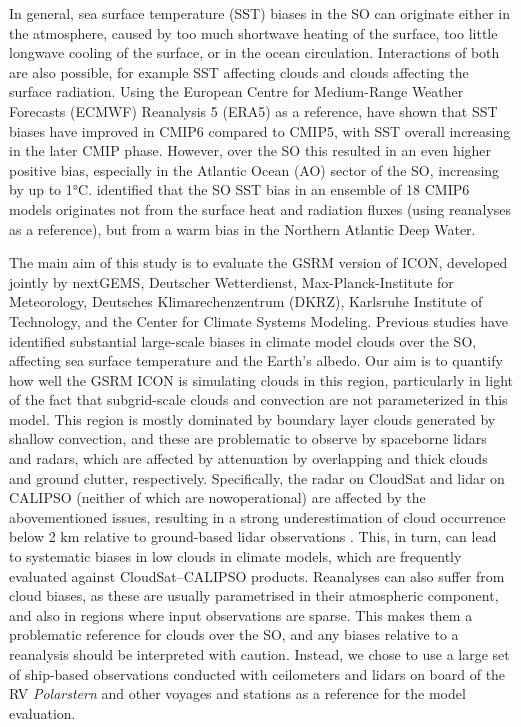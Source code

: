 \documentclass[12pt,a4paper]{article}
\begin{document}
In general, sea surface temperature (SST) biases in the SO can originate either
in the atmosphere, caused by too much shortwave heating of the surface, too
little longwave cooling of the surface, or in the ocean circulation.
Interactions of both are also possible, for example SST affecting clouds and
clouds affecting the surface radiation. Using the European
Centre for Medium-Range Weather Forecasts (ECMWF) Reanalysis 5 (ERA5) as a reference, \cite{zhang2023} have shown that SST
biases have improved in CMIP6 compared to CMIP5, with SST
overall increasing in the later CMIP phase. However, over the SO this resulted
in an even higher positive bias, especially in the Atlantic Ocean (AO) sector
of the SO, increasing by up to 1°C.  \cite{luo2023} identified that the SO SST
bias in an ensemble of 18 CMIP6 models originates not from the surface heat and
radiation fluxes (using reanalyses as a reference), but from a warm bias in the
Northern Atlantic Deep Water.

The main aim of this study is to evaluate the GSRM version of ICON, developed
jointly by nextGEMS, Deutscher Wetterdienst, Max-Planck-Institute for
Meteorology, Deutsches Klimarechenzentrum (DKRZ), Karlsruhe Institute of
Technology, and the Center for Climate Systems Modeling.  Previous studies have
identified substantial large-scale biases in climate model clouds over the SO,
affecting sea surface temperature and the Earth’s albedo. Our aim is to
quantify how well the GSRM ICON is simulating clouds in this region,
particularly in light of the fact that subgrid-scale clouds and convection are
not parameterized in this model. This region is mostly dominated by boundary
layer clouds generated by shallow convection, and these are problematic to
observe by spaceborne lidars and radars, which are affected by attenuation by
overlapping and thick clouds and ground clutter, respectively.  Specifically,
the radar on CloudSat and lidar on CALIPSO (neither of which are nowoperational) are affected by the abovementioned issues, resulting in a strong
underestimation of cloud occurrence below 2 km relative to ground-based lidar
observations \citep{mcerlich2021}.  This, in turn, can lead to systematic
biases in low clouds in climate models, which are frequently evaluated against
CloudSat--CALIPSO products. Reanalyses can also suffer from cloud biases, as
these are usually parametrised in their atmospheric component, and also in
regions where input observations are sparse.  This makes them a problematic
reference for clouds over the SO, and any biases relative to a reanalysis
should be interpreted with caution. Instead, we chose to use a large set of
ship-based observations conducted with ceilometers and lidars on board of the
RV \emph{Polarstern} and other voyages and stations as a reference for the
model evaluation.
\end{document}
